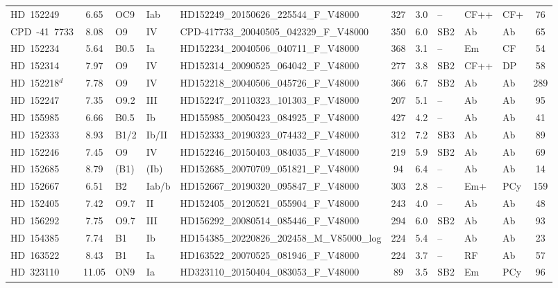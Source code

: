 {\begin{landscape}
\begin{longtable}{lclllcclllc}
\noalign{\smallskip}
HD~152249 & 6.65 & OC9 & Iab & HD152249\_20150626\_225544\_F\_V48000 & 327 & 3.0 & -- & CF++ & CF+ & 76 \\
\noalign{\smallskip}
CPD~-41~7733 & 8.08 & O9 & IV & CPD-417733\_20040505\_042329\_F\_V48000 & 350 & 6.0 & SB2 & Ab & Ab & 65 \\
\noalign{\smallskip}
HD~152234 & 5.64 & B0.5 & Ia & HD152234\_20040506\_040711\_F\_V48000 & 368 & 3.1 & -- & Em & CF & 54 \\
\noalign{\smallskip}
HD~152314 & 7.97 & O9 & IV & HD152314\_20090525\_064042\_F\_V48000 & 277 & 3.8 & SB2 & CF++ & DP & 58 \\
\noalign{\smallskip}
HD~152218$^{d}$ & 7.78 & O9 & IV & HD152218\_20040506\_045726\_F\_V48000 & 366 & 6.7 & SB2 & Ab & Ab & 289 \\
\noalign{\smallskip}
HD~152247 & 7.35 & O9.2 & III & HD152247\_20110323\_101303\_F\_V48000 & 207 & 5.1 & -- & Ab & Ab & 95 \\
\noalign{\smallskip}
HD~155985 & 6.66 & B0.5 & Ib & HD155985\_20050423\_084925\_F\_V48000 & 427 & 4.2 & -- & Ab & Ab & 41 \\
\noalign{\smallskip}
HD~152333 & 8.93 & B1/2 & Ib/II & HD152333\_20190323\_074432\_F\_V48000 & 312 & 7.2 & SB3 & Ab & Ab & 89 \\
\noalign{\smallskip}
HD~152246 & 7.45 & O9 & IV & HD152246\_20150403\_084035\_F\_V48000 & 219 & 5.9 & SB2 & Ab & Ab & 69 \\
\noalign{\smallskip}
HD~152685 & 8.79 & (B1) & (Ib) & HD152685\_20070709\_051821\_F\_V48000 & 94 & 6.4 & -- & Ab & Ab & 14 \\
\noalign{\smallskip}
HD~152667 & 6.51 & B2 & Iab/b & HD152667\_20190320\_095847\_F\_V48000 & 303 & 2.8 & -- & Em+ & PCy & 159 \\
\noalign{\smallskip}
HD~152405 & 7.42 & O9.7 & II & HD152405\_20120521\_055904\_F\_V48000 & 243 & 4.0 & -- & Ab & Ab & 48 \\
\noalign{\smallskip}
HD~156292 & 7.75 & O9.7 & III & HD156292\_20080514\_085446\_F\_V48000 & 294 & 6.0 & SB2 & Ab & Ab & 93 \\
\noalign{\smallskip}
HD~154385 & 7.74 & B1 & Ib & HD154385\_20220826\_202458\_M\_V85000\_log & 224 & 5.4 & -- & Ab & Ab & 23 \\
\noalign{\smallskip}
HD~163522 & 8.43 & B1 & Ia & HD163522\_20070525\_081946\_F\_V48000 & 224 & 3.7 & -- & RF & Ab & 57 \\
\noalign{\smallskip}
HD~323110 & 11.05 & ON9 & Ia & HD323110\_20150404\_083053\_F\_V48000 & 89 & 3.5 & SB2 & Em & PCy & 96 \\

\end{longtable}
\end{landscape}}
